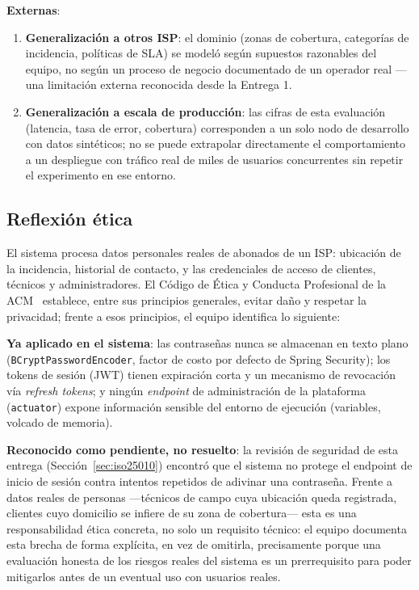 \textbf{Externas}:
\begin{enumerate}[nosep]
  \item \textbf{Generalización a otros ISP}: el dominio (zonas de cobertura, categorías de
        incidencia, políticas de SLA) se modeló según supuestos razonables del equipo, no según
        un proceso de negocio documentado de un operador real —una limitación externa reconocida
        desde la Entrega 1.
  \item \textbf{Generalización a escala de producción}: las cifras de esta evaluación (latencia,
        tasa de error, cobertura) corresponden a un solo nodo de desarrollo con datos sintéticos;
        no se puede extrapolar directamente el comportamiento a un despliegue con tráfico real de
        miles de usuarios concurrentes sin repetir el experimento en ese entorno.
\end{enumerate}

\subsection{Reflexión ética}

El sistema procesa datos personales reales de abonados de un ISP: ubicación de la incidencia,
historial de contacto, y las credenciales de acceso de clientes, técnicos y administradores. El
Código de Ética y Conducta Profesional de la ACM~\cite{acm2018ethics} establece, entre sus
principios generales, evitar daño y respetar la privacidad; frente a esos principios, el equipo
identifica lo siguiente:

\textbf{Ya aplicado en el sistema}: las contraseñas nunca se almacenan en texto plano
(\texttt{BCryptPasswordEncoder}, factor de costo por defecto de Spring Security); los tokens de
sesión (JWT) tienen expiración corta y un mecanismo de revocación vía \emph{refresh tokens}; y
ningún \emph{endpoint} de administración de la plataforma (\texttt{actuator}) expone información
sensible del entorno de ejecución (variables, volcado de memoria).

\textbf{Reconocido como pendiente, no resuelto}: la revisión de seguridad de esta entrega
(Sección~\ref{sec:iso25010}) encontró que el sistema no protege el endpoint de inicio de sesión
contra intentos repetidos de adivinar una contraseña. Frente a datos reales de personas —técnicos
de campo cuya ubicación queda registrada, clientes cuyo domicilio se infiere de su zona de
cobertura— esta es una responsabilidad ética concreta, no solo un requisito técnico: el equipo
documenta esta brecha de forma explícita, en vez de omitirla, precisamente porque una evaluación
honesta de los riesgos reales del sistema es un prerrequisito para poder mitigarlos antes de un
eventual uso con usuarios reales.
